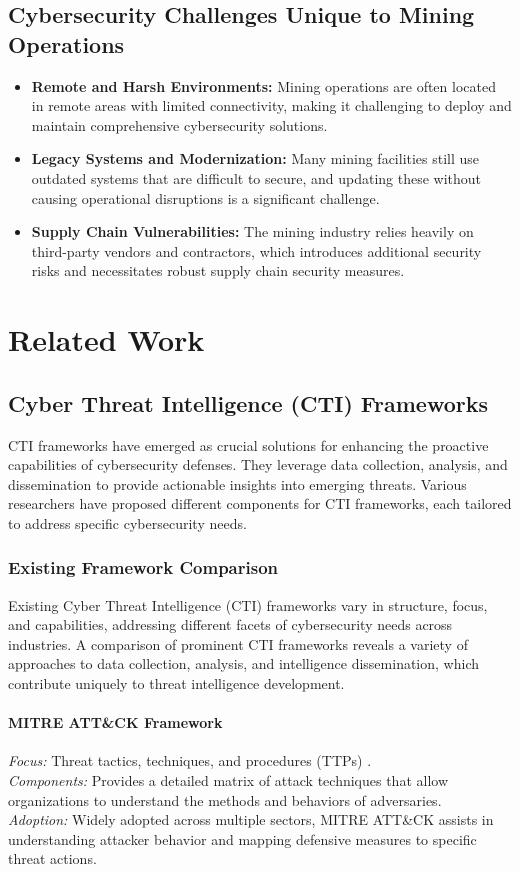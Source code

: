\documentclass[a4paper,twoside,12pt]{report}
\begin{document}
\subsection{Cybersecurity Challenges Unique to Mining Operations}
\begin{itemize}
    \item \textbf{Remote and Harsh Environments:} Mining operations are often located in remote areas with limited connectivity, making it challenging to deploy and maintain comprehensive cybersecurity solutions.
    \item \textbf{Legacy Systems and Modernization:} Many mining facilities still use outdated systems that are difficult to secure, and updating these without causing operational disruptions is a significant challenge.
    \item \textbf{Supply Chain Vulnerabilities:} The mining industry relies heavily on third-party vendors and contractors, which introduces additional security risks and necessitates robust supply chain security measures.
\end{itemize}

\section{Related Work}
\subsection{Cyber Threat Intelligence (CTI) Frameworks}
CTI frameworks have emerged as crucial solutions for enhancing the proactive capabilities of cybersecurity defenses. They leverage data collection, analysis, and dissemination to provide actionable insights into emerging threats. Various researchers have proposed different components for CTI frameworks, each tailored to address specific cybersecurity needs.


\subsubsection{Existing Framework Comparison}
Existing Cyber Threat Intelligence (CTI) frameworks vary in structure, focus, and capabilities, addressing different facets of cybersecurity needs across industries. A comparison of prominent CTI frameworks reveals a variety of approaches to data collection, analysis, and intelligence dissemination, which contribute uniquely to threat intelligence development.

\paragraph{MITRE ATT\&CK Framework \citet{georgiadou2021assessing}}
\textit{Focus:} Threat tactics, techniques, and procedures (TTPs) \citet{shahi2018tactics}. \\
\textit{Components:} Provides a detailed matrix of attack techniques that allow organizations to understand the methods and behaviors of adversaries. \\
\textit{Adoption:} Widely adopted across multiple sectors, MITRE ATT\&CK assists in understanding attacker behavior and mapping defensive measures to specific threat actions.
\end{document}
